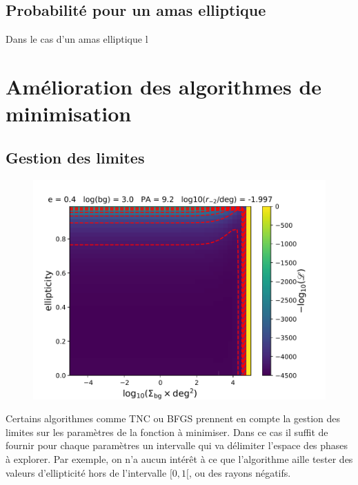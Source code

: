 \documentclass[a4paper,11pt]{article}
\numberwithin{equation}{section}
\begin{document}
  \subsection{Probabilité pour un amas elliptique}
  Dans le cas d'un amas elliptique l
  
\newpage
\section{Amélioration des algorithmes de minimisation}
\subsection{Gestion des limites}
	\begin{figure}
		\centering
		\includegraphics[width=\linewidth]{fixedPA_and_loga.pdf}
	\end{figure}
	Certains algorithmes comme TNC ou BFGS prennent en compte la gestion des limites sur les paramètres de la fonction à minimiser. Dans ce cas il suffit de fournir pour chaque paramètres un intervalle qui va délimiter l'espace des phases à explorer.\newline
	Par exemple, on n'a aucun intérêt à ce que l'algorithme aille tester des valeurs d'ellipticité hors de l'intervalle $[0,1[$, ou des rayons négatifs.
\end{document}
